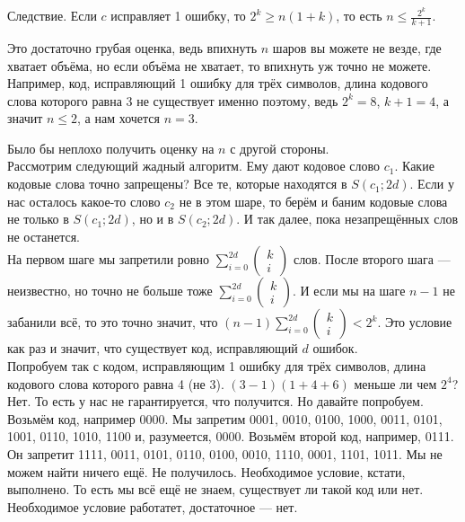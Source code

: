 \documentclass{article}
\begin{document}
\begin{itemize}
\begin{Proof}
        \end{Proof}
        \thm Следствие. Если $c$ исправляет 1 ошибку, то $2^k\geqslant n(1+k)$, то есть $n\leqslant\frac{2^k}{k+1}$.
        \begin{Comment}
            Это достаточно грубая оценка, ведь впихнуть $n$ шаров вы можете не везде, где хватает объёма, но если объёма не хватает, то впихнуть уж точно не можете.\\
            Например, код, исправляющий 1 ошибку для трёх символов, длина кодового слова которого равна 3 не существует именно поэтому, ведь $2^k=8$, $k+1=4$, а значит $n\leqslant2$, а нам хочется $n=3$.
        \end{Comment}
        \begin{Comment}
            Было бы неплохо получить оценку на $n$ с другой стороны.\\
            Рассмотрим следующий жадный алгоритм. Ему дают кодовое слово $c_1$. Какие кодовые слова точно запрещены? Все те, которые находятся в $S(c_1;2d)$. Если у нас осталось какое-то слово $c_2$ не в этом шаре, то берём и баним кодовые слова не только в $S(c_1;2d)$, но и в $S(c_2;2d)$. И так далее, пока незапрещённых слов не останется.\\
            На первом шаге мы запретили ровно $\sum\limits_{i=0}^{2d}\left(\begin{matrix}k\\i\end{matrix}\right)$ слов. После второго шага --- неизвестно, но точно не больше тоже $\sum\limits_{i=0}^{2d}\left(\begin{matrix}k\\i\end{matrix}\right)$. И если мы на шаге $n-1$ не забанили всё, то это точно значит, что $(n-1)\sum\limits_{i=0}^{2d}\left(\begin{matrix}k\\i\end{matrix}\right)<2^k$. Это условие как раз и значит, что существует код, исправляющий $d$ ошибок.\\
            Попробуем так с кодом, исправляющим 1 ошибку для трёх символов, длина кодового слова которого равна 4 (не 3). $(3-1)(1+4+6)$ меньше ли чем $2^4$? Нет. То есть у нас не гарантируется, что получится. Но давайте попробуем. Возьмём код, например 0000. Мы запретим 0001, 0010, 0100, 1000, 0011, 0101, 1001, 0110, 1010, 1100 и, разумеется, 0000. Возьмём второй код, например, 0111. Он запретит 1111, 0011, 0101, 0110, 0100, 0010, 1110, 0001, 1101, 1011. Мы не можем найти ничего ещё. Не получилось. Необходимое условие, кстати, выполнено. То есть мы всё ещё не знаем, существует ли такой код или нет. Необходимое условие работатет, достаточное --- нет.\\

\end{Comment}
\end{itemize}
\end{document}
